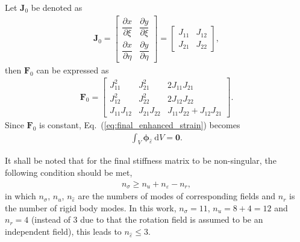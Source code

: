 \documentclass[3p,sort&compress,review,11pt]{elsarticle}
\newcommand*{\md}[1]{\mathrm{d}#1}
\newcommand*{\pfrac}[2]{\dfrac{\partial#1}{\partial#2}}
\newcommand*{\eqsref}[1]{Eq.~(\ref{#1})}
\begin{document}
Let $\mathbold{J}_0$ be denoted as
\begin{gather*}
\mathbold{J}_0=\begin{bmatrix}
\pfrac{x}{\xi}&\pfrac{y}{\xi}\\[3mm]
\pfrac{x}{\eta}&\pfrac{y}{\eta}
\end{bmatrix}=\begin{bmatrix}
J_{11}&J_{12}\\[2mm]
J_{21}&J_{22}
\end{bmatrix},
\end{gather*}
then $\mathbold{F}_0$ can be expressed as
\begin{gather}
\mathbold{F}_0=\begin{bmatrix}
	J_{11}^2     & J_{21}^2     & 2J_{11}J_{21}             \\
	J_{12}^2     & J_{22}^2     & 2J_{12}J_{22}             \\
	J_{11}J_{12} & J_{21}J_{22} & J_{11}J_{22}+J_{12}J_{21}
\end{bmatrix}.
\end{gather}
Since $\mathbold{F}_0$ is constant, \eqsref{eq:final_enhanced_strain} becomes
\begin{gather}\label{eq:new_enhanced_strain}
\int_V\mathbold{\phi}_{\hat{\varepsilon}}~\md{V}=\mathbold{0}.
\end{gather}

It shall be noted that for the final stiffness matrix to be non-singular, the following condition should be met,
\begin{gather}
n_\sigma\geqslant{}n_u+n_{\hat{\varepsilon}}-n_r,
\end{gather}
in which $n_\sigma$, $n_u$, $n_{\hat{\varepsilon}}$ are the numbers of modes of corresponding fields and $n_r$ is the number of rigid body modes. In this work, $n_\sigma=11$, $n_u=8+4=12$ and $n_r=4$ (instead of \num{3} due to that the rotation field is assumed to be an independent field), this leads to $n_{\hat{\varepsilon}}\leqslant3$.
\end{document}
